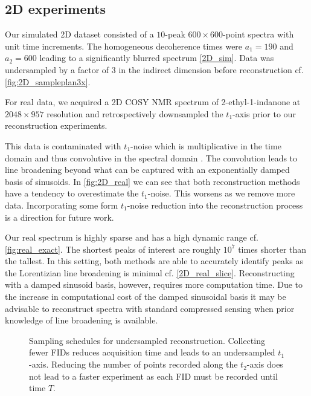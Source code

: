 \documentclass[11pt]{article}
\begin{document}
\subsection{2D experiments}

    Our simulated 2D dataset consisted of a $10$-peak $600 \times 600$-point spectra with unit time increments. The homogeneous decoherence times were $a_1=190$ and $a_2 = 600$ leading to a significantly blurred spectrum \cref{2D_sim}. Data was undersampled by a factor of $3$ in the indirect dimension before reconstruction cf. \cref{fig:2D_sampleplan3x}.

     For real data, we acquired a 2D COSY NMR spectrum of 2-ethyl-1-indanone at $2048 \times 957$ resolution and retrospectively downsampled the $t_1$-axis prior to our reconstruction experiments.

     This data is contaminated with $t_1$-noise which is multiplicative in the time domain and thus convolutive in the spectral domain \cite{Granwehr2007}. The convolution leads to line broadening beyond what can be captured with an exponentially damped basis of sinusoids. In \cref{fig:2D_real} we can see that both reconstruction methods have a tendency to overestimate the $t_1$-noise. This worsens as we remove more data. Incorporating some form $t_1$-noise reduction into the reconstruction process is a direction for future work.

    Our real spectrum is highly sparse and has a high dynamic range cf. \cref{fig:real_exact}. The shortest peaks of interest are roughly $10^7$ times shorter than the tallest. In this setting, both methods are able to accurately identify peaks as the Lorentizian line broadening is minimal cf. \cref{2D_real_slice}. Reconstructing with a damped sinusoid basis, however, requires more computation time. Due to the increase in computational cost of the damped sinusoidal basis it may be advisable to reconstruct spectra with standard compressed sensing when prior knowledge of line broadening is available.


\begin{figure}
\centering
{}
\qquad
{}
\qquad
\caption{Sampling schedules for undersampled reconstruction. Collecting fewer FIDs reduces acquisition time and leads to an undersampled $t_1$-axis. Reducing the number of points recorded along the $t_2$-axis does not lead to a faster experiment as each FID must be recorded until time $T$.}
\label{fig:2D_sampleplan}
\end{figure}
\end{document}
